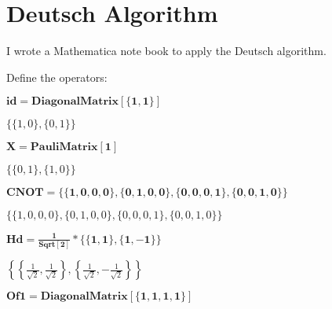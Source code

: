 

\section{Deutsch Algorithm}
I wrote a Mathematica note book to apply the Deutsch algorithm.

Define the operators:

\begin{doublespace}
    \noindent\(\pmb{\text{id} = \text{DiagonalMatrix}[\{1, 1\}]}\)
\end{doublespace}

\begin{doublespace}
    \noindent\(\{\{1,0\},\{0,1\}\}\)
\end{doublespace}

\begin{doublespace}
    \noindent\(\pmb{X = \text{PauliMatrix}[1]}\)
\end{doublespace}

\begin{doublespace}
    \noindent\(\{\{0,1\},\{1,0\}\}\)
\end{doublespace}

\begin{doublespace}
    \noindent\(\pmb{\text{CNOT} = \{\{1, 0, 0, 0\}, \{0, 1, 0, 0\}, \{0, 0, 0, 1\}, \{0, 0, 1, 0\}\}}\)
\end{doublespace}

\begin{doublespace}
    \noindent\(\{\{1,0,0,0\},\{0,1,0,0\},\{0,0,0,1\},\{0,0,1,0\}\}\)
\end{doublespace}

\begin{doublespace}
    \noindent\(\pmb{\text{Hd} = \frac{1}{\text{Sqrt}[2]}*\{\{1, 1\}, \{1, -1\}\}}\)
\end{doublespace}

\begin{doublespace}
    \noindent\(\left\{\left\{\frac{1}{\sqrt{2}},\frac{1}{\sqrt{2}}\right\},\left\{\frac{1}{\sqrt{2}},-\frac{1}{\sqrt{2}}\right\}\right\}\)
\end{doublespace}

\begin{doublespace}
    \noindent\(\pmb{\text{Of1} = \text{DiagonalMatrix}[\{1, 1, 1, 1\}]}\)
\end{doublespace}

